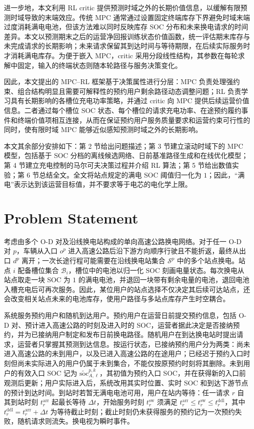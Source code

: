 \documentclass[12pt,a4paper,UTF8]{ctexart}
\begin{document}
进一步地，本文利用 RL critic 提供预测时域之外的长期价值信息，以缓解有限预测时域导致的末端效应。传统 MPC 通常通过设置固定终端库存下界避免时域末端过度消耗满电电池，但该方法难以同时反映库存 SOC 分布和未来换电请求的时间差异。本文以预测期末之后的运营净回报训练状态价值函数，统一评估期末库存与未完成请求的长期影响；未来请求保留其到达时间与等待期限，在后续实际服务时才消耗满电库存。为便于嵌入 MPC，critic 采用分段线性结构，其参数在每轮求解中固定，输入的终端状态则随本轮路径与服务决策变化。

因此，本文提出的 MPC--RL 框架基于决策属性进行分层：MPC 负责处理强约束、组合结构明显且需要可解释性的预约用户剩余路径动态调整问题；RL 负责学习具有长期影响的各槽位充电功率策略，并通过 critic 向 MPC 提供后续运营价值信息。二者通过每个槽位 SOC 状态、每个槽位的请求充电功率、在途预约履约事件和终端价值项相互连接，从而在保证预约用户服务质量要求和运营约束可行性的同时，使有限时域 MPC 能够近似感知预测时域之外的长期影响。


本文其余部分安排如下：第 2 节给出问题描述；第 3 节建立滚动时域下的 MPC 模型，包括基于 SOC 分档的离线候选网络、日前基准路径生成和在线优化模型；第 4 节建立充电控制的马尔可夫决策过程并介绍 RL 算法；第 5 节给出数值实验；第 6 节总结全文。全文将站点规定的满电 SOC 阈值归一化为 $1$；因此，“满电”表示达到该运营目标值，并不要求等于电芯的电化学上限。






\section{Problem Statement}

考虑由多个 O-D 对及沿线换电站构成的单向高速公路换电网络。对于任一 O-D 对 $p$，车辆从入口 $o^p$ 进入高速公路后沿下游方向顺序行驶且不能折返，最终从出口 $d^p$ 离开；一次长途行程可能需要在沿线换电站集合 $\mathcal S^p$ 中的多个站点换电。站点 $i$ 配备槽位集合 $\mathcal B_i$，槽位中的电池以归一化 SOC 刻画电量状态。每次换电从站点取走一块 SOC 为 $1$ 的满电电池，并退回一块带有剩余电量的电池，退回电池入槽充电后可再次服务。因此，某位用户的站点选择不仅决定其后续可达站点，还会改变相关站点未来的电池库存，使用户路径与多站点库存产生时空耦合。

系统服务预约用户和随机到达用户。预约用户在运营日前提交预约信息，包括 O-D 对、预计进入高速公路的时刻及进入时的 SOC，运营者据此决定是否接纳预约，并为已接纳用户制定和发布日前换电路径。随机用户在到达换电站时提出请求，运营者只掌握其预测到达信息。按运行状态，已接纳预约用户分为两类：尚未进入高速公路的未到用户，以及已进入高速公路的在途用户；已经迟于预约入口时刻但尚未实际进入的用户仍属于未到集合，不能仅按原预约时刻将其删除。未到用户的有效入口 SOC 记为 $\widetilde{\mathrm{soc}}_{A,\ell}^{p,k}$，其初值为预约入口 SOC，并在获得新的入口前观测后更新；用户实际进入后，系统改用其实时位置、实时 SOC 和到达下游节点的预计到达时间。到站时若暂无满电电池可用，用户在站内等待：任一请求 $r$ 自其到站时刻 $t_r^{\mathrm{arr}}$ 起最长等待 $\Delta t$，开始服务时刻 $t_r^{\mathrm{sw}}$ 须满足 $t_r^{\mathrm{arr}}\le t_r^{\mathrm{sw}}\le t_r^{\mathrm{ddl}}$，其中 $t_r^{\mathrm{ddl}}=t_r^{\mathrm{arr}}+\Delta t$ 为等待截止时刻；截止时刻仍未获得服务的预约记为一次预约失败，随机请求则流失。换电视为瞬时事件。
\end{document}
